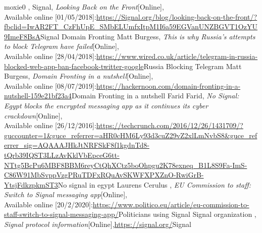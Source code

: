 \begin{thebibliography}{9}
    \vspace{-0.5cm}
    moxie0 , Signal,
    \textit{Looking Back on the Front}[Online],\\
    Available online [01/05/2018]:\url{https://Signal.org/blog/looking-back-on-the-front/?fbclid=IwAR2FT_CzFhUpE_SMbELUmfxItpM1I6a59EGVanUNZBGVT1OzYU9ImeF8BsA}{Signal Domain Fronting}
    \vspace{-0.5cm}
    Matt Burgess,
    \textit{This is why Russia's attempts to block Telegram have failed}[Online],\\
    Available online [28/04/2018]:\url{https://www.wired.co.uk/article/telegram-in-russia-blocked-web-app-ban-facebook-twitter-google}{Russia Blocking Telegram}
    \vspace{-0.5cm} 
    Matt Burgess,
    \textit{Domain Fronting in a nutshell}[Online],\\
    Available online [08/07/2019]:\url{https://hackernoon.com/domain-fronting-in-a-nutshell-159e21bf23a4}{Domain Fronting in a nutshell}
    \vspace{-0.5cm} 
    Farid Farid,
    \textit{No Signal: Egypt blocks the encrypted messaging app as it continues its cyber crackdown}[Online],\\
    Available online [26/12/2016]:\url{https://techcrunch.com/2016/12/26/1431709/?guccounter=1&guce_referrer=aHR0cHM6Ly93d3cuZ29vZ2xlLmNvbS8&guce_referrer_sig=AQAAAJHkJtNRFSkF8f1kgdnTd8-tQrb39IQST3LLzAvKklVbEpceG6tt-NTtg5BcPu6MBF8BBM6reyCtQhXCtz5boOhpgu2K78exneq_B1L8S9Fa-ImS-C86W91MbSvppVzgPRuTDFxRQuAvSKWFXPXZnO-RwiGrB-YtsjFdkzpkmST3}{No signal in egypt}
    \vspace{-0.5cm} 
    Laurens Cerulus	,
    \textit{EU Commission to staff: Switch to Signal messaging app}[Online],\\
    Available online [20/2/2020]:\url{https://www.politico.eu/article/eu-commission-to-staff-switch-to-signal-messaging-app/}{Politicians using Signal}
    \vspace{-0.5cm} 
    Signal organization	,
    \textit{Signal protocol information}[Online],\url{https://signal.org/}{Signal}
    \vspace{-0.5cm}
   
\end{thebibliography}
\endgroup

\vspace{-0.3cm}
